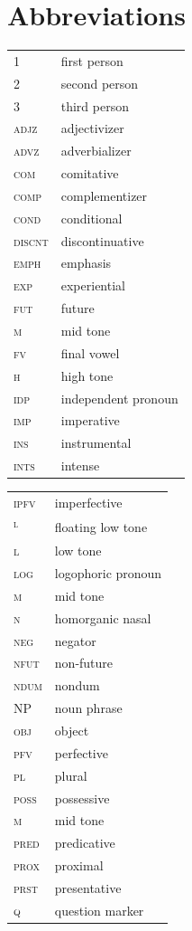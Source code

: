\documentclass[output=paper,colorlinks,citecolor=brown]{langscibook}
\begin{document}
\section*{Abbreviations}
\largerpage[3]
\begin{tabularx}{.45\textwidth}{lQ}
1 & first person \\
2 & second person \\
3 & third person \\
\scshape adjz & adjectivizer \\
\scshape advz & adverbializer \\
\scshape com & comitative \\
\scshape comp & complementizer \\
\scshape cond & conditional \\
\scshape discnt & discontinuative \\
\scshape emph & emphasis \\
\scshape exp & experiential \\
\scshape fut & future \\
\scshape m & mid tone \\
\scshape fv & final vowel \\
\scshape h & high tone \\
\scshape idp & independent pronoun \\
\scshape imp & imperative \\
\scshape ins & instrumental \\
\scshape ints & intense \\
\end{tabularx}
\begin{tabularx}{.45\textwidth}{lQ}
\scshape ipfv & imperfective \\
\scshape \textsuperscript{l} & floating low tone \\
\scshape l & low tone \\
\scshape log & logophoric pronoun \\
\scshape m & mid tone \\
\scshape n & homorganic nasal \\
\scshape neg & negator \\
\scshape nfut & non-future \\
\scshape ndum & nondum \\
NP & noun phrase \\
\scshape obj & object \\
\scshape pfv & perfective \\
\scshape pl & plural \\
\scshape poss & possessive \\
\scshape m & mid tone \\
\scshape pred & predicative \\
\scshape prox & proximal \\
\scshape prst & presentative \\
\scshape q & question marker \\
\end{tabularx}
\end{document}
